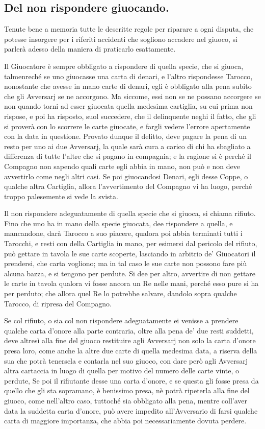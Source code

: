 \documentclass[11pt,a6paper]{article}
\begin{document}
\subsection*{Del non rispondere giuocando.}

Tenute bene a memoria tutte le descritte regole per riparare a ogni disputa, che potesse insorgere per i riferiti accidenti che sogliono accadere nel giuoco, si parlerà adesso della maniera di praticarlo esattamente.

Il Giuocatore è sempre obbligato a rispondere di quella specie, che si giuoca, talmenreché se uno giuocasse una carta di denari, e l'altro rispondesse Tarocco, nonostante che avesse in mano carte di denari, egli è obbligato alla pena subito che gli Avversarj se ne accorgono. Ma siccome, essi non se ne possano accorgere se non quando torni ad esser giuocata quella medesima cartiglia, su cui prima non rispose, e poi ha risposto, suol succedere, che il delinquente neghi il fatto, che gli si proverà con lo scorrere le carte giuocate, e fargli vedere l'errore apertamente con la data in
questione. Provato dunque il delitto, deve pagare la pena di un resto per uno ai due Avversarj, la quale sarà cura a carico di chi ha sbagliato a differenza di tutte l'altre che si pagano in compagnia; e la ragione si è perché il Compagno non sapendo quali carte egli abbia in mano, non può e non deve avvertirlo come negli altri casi. Se poi giuocandosi Denari, egli desse Coppe, o qualche altra Cartiglia, allora l'avvertimento del Compagno vi ha luogo, perché troppo palesemente si vede la svista.

Il non rispondere adeguatamente di quella specie che si giuoca, si chiama rifiuto. Fino che uno ha in mano della specie giuocata, dee rispondere a quella, e mancandone, darà Tarocco a suo piacere, qualora poi abbia terminati tutti i Tarocchi, e resti con della Cartiglia in mano, per esimersi dal pericolo del rifiuto, può gettare in tavola le sue carte scoperte, lasciando in arbitrio de' Giuocatori il prendersi, che carta vogliono; ma in tal caso le sue carte non possono fare più alcuna bazza, e si tengono per 
perdute. Si dee per altro, avvertire di non gettare le carte in tavola qualora vi fosse ancora un Re nelle mani, perché esso pure si ha per perduto; che allora quel Re lo potrebbe salvare, dandolo sopra qualche Tarocco, di ripresa del Compagno.

Se col rifiuto, o sia col non rispondere adeguatamente ei venisse a prendere qualche carta d'onore alla parte contraria, oltre alla pena de' due resti suddetti, deve altresì alla fine del giuoco restituire agli Avversarj non solo la carta d'onore presa loro, come anche la altre due carte di quella medesima data, a riserva della sua che potrà tenersela e contarla nel suo giuoco, con dare però agli Avversarj altra cartaccia in luogo di quella per motivo del numero delle carte vinte, o perdute, Se poi il rifiutante desse una carta d'onore, e se questa gli fosse presa da quello che gli sta sopramano, è benissimo presa, nè potrà ripeterla alla fine del giuoco, come nell'altro caso, tuttoché sia obbligato alla pena, mentre coll'aver data la suddetta
carta d'onore, può avere impedito all'Avversario di farsi qualche carta di maggiore importanza, che abbia poi necessariamente dovuta perdere.
\end{document}
